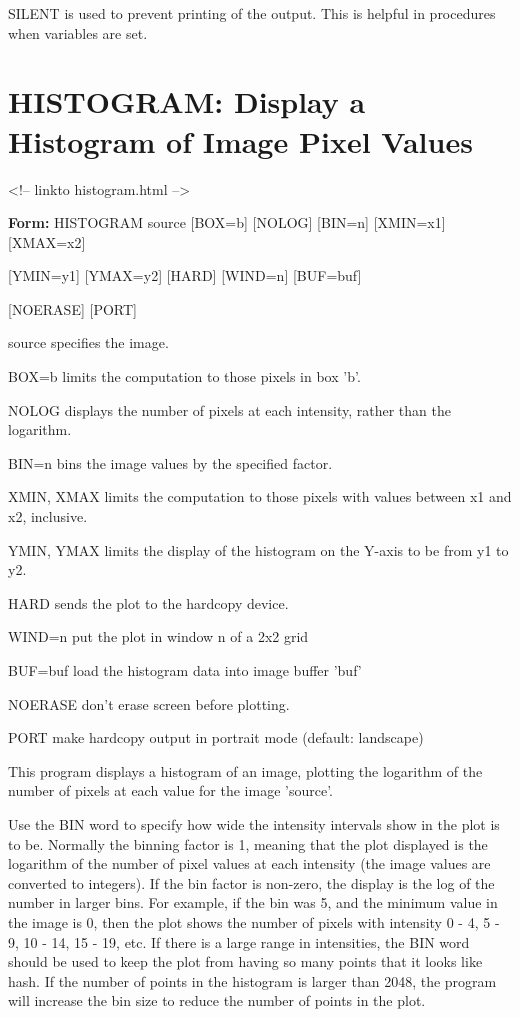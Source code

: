 SILENT is used to prevent printing of the output.  This is helpful in
procedures when variables are set.

\section{HISTOGRAM: Display a Histogram of Image Pixel Values}
\begin{rawhtml}
<!-- linkto histogram.html -->
\end{rawhtml}
\begin{command}
  \item[\textbf{Form:}   HISTOGRAM source {[BOX=b]} {[NOLOG]} {[BIN=n]} {[XMIN=x1]} {[XMAX=x2]}\hfill]{}
  \item{{[YMIN=y1]} {[YMAX=y2]} {[HARD]} {[WIND=n]} {[BUF=buf]}}
  \item{{[NOERASE]} {[PORT]}}
  \item[source\hfill]{   specifies the image.}
  \item[BOX=b\hfill]{limits the computation to those pixels in box 'b'.}
  \item[NOLOG\hfill]{displays the number of pixels at each intensity,
rather than the logarithm.}
  \item[BIN=n\hfill]{   bins the image values by the specified factor.}
  \item[XMIN, XMAX\hfill]{  limits the computation to those pixels with values
between x1 and x2, inclusive.}
  \item[YMIN, YMAX   \hfill]{   limits the display of the histogram on the Y-axis
to be from y1 to y2.}
  \item[HARD\hfill]{sends the plot to the hardcopy device.}
  \item[WIND=n\hfill]{put the plot in window n of a 2x2 grid}
  \item[BUF=buf\hfill]{  load the histogram data into image buffer 'buf'}
  \item[   NOERASE   \hfill]{don't erase screen before plotting.}
  \item[PORT\hfill]{make hardcopy output in portrait mode (default: landscape)}
\end{command}

This program displays a histogram of an image, plotting the logarithm of
the number of pixels at each value for the image 'source'.

Use the BIN word to specify how wide the intensity intervals show in the
plot is to be.  Normally the binning factor is 1, meaning that the plot
displayed is the logarithm of the number of pixel values at each intensity
(the image values are converted to integers).  If the bin factor is
non-zero, the display is the log of the number in larger bins.  For
example, if the bin was 5, and the minimum value in the image is 0, then
the plot shows the number of pixels with intensity 0 - 4, 5 - 9, 10 - 14,
15 - 19, etc. If there is a large range in intensities, the BIN word should
be used to keep the plot from having so many points that it looks like
hash. If the number of points in the histogram is larger than 2048, the
program will increase the bin size to reduce the number of points in the
plot.

